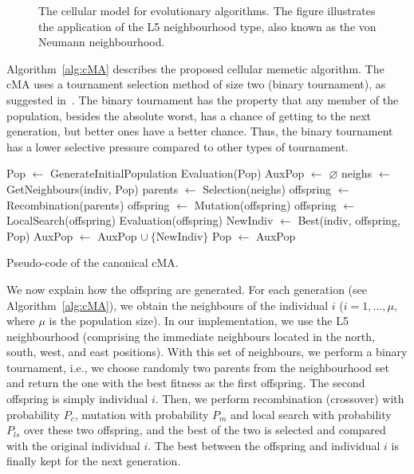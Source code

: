 \begin{figure}[!ht]
	\centering
	\caption{The cellular model for evolutionary algorithms. The figure illustrates the application of the L5 neighbourhood type, also known as the von Neumann neighbourhood.}
	\label{fig:ParalellModelsEA}
\end{figure}


Algorithm~\ref{alg:cMA} describes the proposed cellular memetic algorithm. The cMA uses a tournament selection method of size two (binary tournament), as suggested in~\citep{Alba2008}. The binary tournament has the property that any member of the population, besides the absolute worst, has a chance of getting to the next generation, but better ones have a better chance. Thus, the binary tournament has a lower selective pressure compared to other types of tournament. 

\begin{algorithm}[!ht]
	\begin{algorithmic}[1]
		\State Pop $\leftarrow$ GenerateInitialPopulation
		\State Evaluation(Pop)
		\State AuxPop $\leftarrow$ $\varnothing$ 
		\State neighs $\leftarrow$ GetNeighbours(indiv, Pop)
		\State parents $\leftarrow$ Selection(neighs)
		\State offspring $\leftarrow$ Recombination(parents)
		\State offspring $\leftarrow$ Mutation(offspring)
		\State offspring $\leftarrow$ LocalSearch(offspring)
		\State Evaluation(offspring)
		\State NewIndiv $\leftarrow$ Best(indiv, offspring, Pop)
		\State AuxPop $\leftarrow$ AuxPop $\cup \ \{ \text{NewIndiv} \}$
		\EndFor
		\State Pop $\leftarrow$ AuxPop
		\EndWhile
		\EndProcedure
	\end{algorithmic}
	\caption{Pseudo-code of the canonical cMA.}
	\label{alg:cMA}
\end{algorithm}

We now explain how the offspring are generated. For each generation (see Algorithm~\ref{alg:cMA}), we obtain the neighbours of the individual $i$ ($i = 1, \ldots, \mu$,
where $\mu$ is the population size). In our implementation, we use the L5 neighbourhood (comprising the immediate neighbours located in the north, south, west, and east positions). With this set of neighbours, we perform a binary tournament, i.e., we choose randomly two
parents from the neighbourhood set and return the one with the best fitness as the first offspring. The second offspring is simply individual $i$. Then, we perform recombination (crossover) with probability $P_c$, mutation with probability $P_m$ and local search with probability $P_{ls}$ over these two offspring, and the best of the two is selected and compared with the original individual $i$. The best between the offspring and individual $i$ is finally kept for the next generation.

